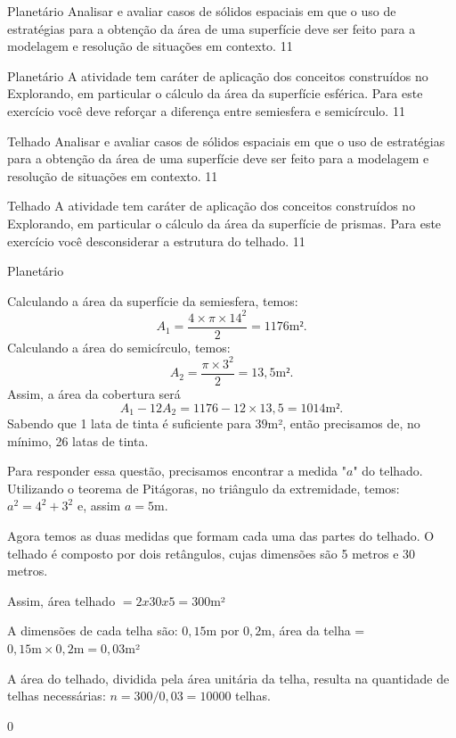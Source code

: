 \clearpage
\def\currentcolor{session2}

\begin{objectives}{Planetário}
{
  Analisar e avaliar casos de sólidos espaciais em que o uso de estratégias para a obtenção da área de uma superfície deve ser feito para a modelagem e resolução de situações em contexto.
}{1}{1}
\end{objectives}
\begin{sugestions}{Planetário}
{
  A atividade tem caráter de aplicação dos conceitos construídos no Explorando, em particular o cálculo da área da superfície esférica. Para este exercício você deve reforçar a diferença entre semiesfera e semicírculo.
}{1}{1}
\end{sugestions}

\begin{objectives}{Telhado}
{
  Analisar e avaliar casos de sólidos espaciais em que o uso de estratégias para a obtenção da área de uma superfície deve ser feito para a modelagem e resolução de situações em contexto.
}{1}{1}
\end{objectives}
\begin{sugestions}{Telhado}
{
  A atividade tem caráter de aplicação dos conceitos construídos no Explorando, em particular o cálculo da área da superfície de prismas. Para este exercício você desconsiderar a estrutura do telhado.
}{1}{1}
\end{sugestions}


\begin{answer}{Planetário}
{
  Calculando a área da superfície da semiesfera, temos:
\begin{equation*}
  A_1=\frac{4\times\pi\times14^2}{2}=1176\text{m²}.
\end{equation*}
Calculando a área do semicírculo, temos: 
\begin{equation*}
A_2=\frac{\pi\times3^2}{2}=13{,}5\text{m²}.
\end{equation*}
Assim, a área da cobertura será
\begin{equation*}
A_1-12A_2=1176-12\times13{,}5=1014\text{m²}.
\end{equation*}
Sabendo que 1 lata de tinta é suficiente para $39$m², então precisamos de, no mínimo, 26 latas de tinta.


Para responder essa questão, precisamos encontrar a medida "$a$" do telhado. Utilizando o teorema de Pitágoras, no triângulo da extremidade, temos: $a^2= 4^2+ 3^2$ e, assim $a = 5$m.

Agora temos as duas medidas que formam cada uma das partes do telhado. O telhado é composto por dois retângulos, cujas dimensões são 5 metros e 30 metros.

Assim, área telhado $= 2 x 30 x 5 = 300$m²

A dimensões de cada telha são: $0{,}15$m por $0{,}2$m, área da telha = $0{,}15\text{m}\times0{,}2 \text{m} = 0{,}03$m²

A área do telhado, dividida pela área unitária da telha, resulta na quantidade de telhas necessárias: $n =  300/0{,}03= 10000$ telhas.

}{0}
\end{answer}

